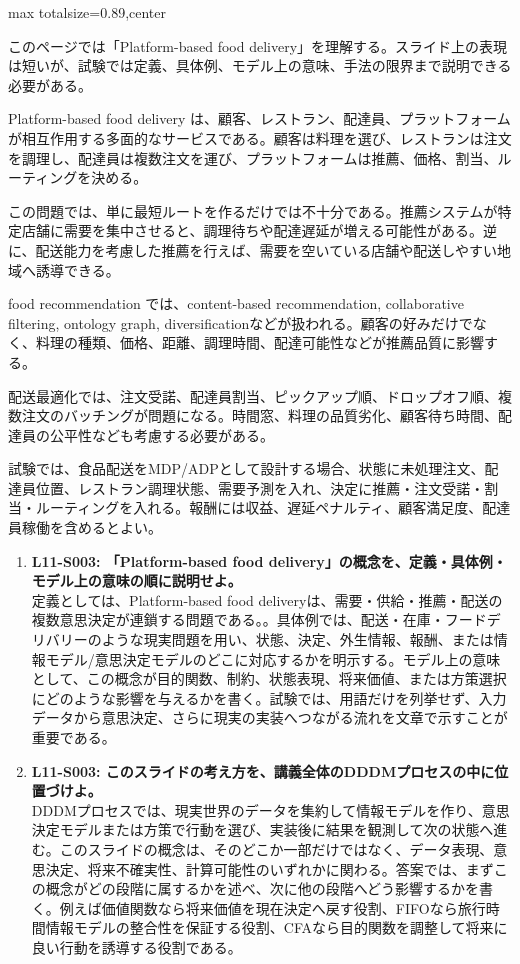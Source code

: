 \begin{minipage}[t]{0.58\textwidth}
\begin{adjustbox}{max totalsize={\textwidth}{0.89\textheight},center}
\begin{minipage}{\textwidth}\scriptsize
{}このページでは「Platform-based food delivery」を理解する。スライド上の表現は短いが、試験では定義、具体例、モデル上の意味、手法の限界まで説明できる必要がある。\par
Platform-based food delivery は、顧客、レストラン、配達員、プラットフォームが相互作用する多面的なサービスである。顧客は料理を選び、レストランは注文を調理し、配達員は複数注文を運び、プラットフォームは推薦、価格、割当、ルーティングを決める。\par
この問題では、単に最短ルートを作るだけでは不十分である。推薦システムが特定店舗に需要を集中させると、調理待ちや配達遅延が増える可能性がある。逆に、配送能力を考慮した推薦を行えば、需要を空いている店舗や配送しやすい地域へ誘導できる。\par
food recommendation では、content-based recommendation, collaborative filtering, ontology graph, diversificationなどが扱われる。顧客の好みだけでなく、料理の種類、価格、距離、調理時間、配達可能性などが推薦品質に影響する。\par
配送最適化では、注文受諾、配達員割当、ピックアップ順、ドロップオフ順、複数注文のバッチングが問題になる。時間窓、料理の品質劣化、顧客待ち時間、配達員の公平性なども考慮する必要がある。\par
試験では、食品配送をMDP/ADPとして設計する場合、状態に未処理注文、配達員位置、レストラン調理状態、需要予測を入れ、決定に推薦・注文受諾・割当・ルーティングを入れる。報酬には収益、遅延ペナルティ、顧客満足度、配達員稼働を含めるとよい。\par{}\begin{enumerate}\item \textbf{L11-S003: 「Platform-based food delivery」の概念を、定義・具体例・モデル上の意味の順に説明せよ。}\\定義としては、Platform-based food deliveryは、需要・供給・推薦・配送の複数意思決定が連鎖する問題である。。具体例では、配送・在庫・フードデリバリーのような現実問題を用い、状態、決定、外生情報、報酬、または情報モデル/意思決定モデルのどこに対応するかを明示する。モデル上の意味として、この概念が目的関数、制約、状態表現、将来価値、または方策選択にどのような影響を与えるかを書く。試験では、用語だけを列挙せず、入力データから意思決定、さらに現実の実装へつながる流れを文章で示すことが重要である。\item \textbf{L11-S003: このスライドの考え方を、講義全体のDDDMプロセスの中に位置づけよ。}\\DDDMプロセスでは、現実世界のデータを集約して情報モデルを作り、意思決定モデルまたは方策で行動を選び、実装後に結果を観測して次の状態へ進む。このスライドの概念は、そのどこか一部だけではなく、データ表現、意思決定、将来不確実性、計算可能性のいずれかに関わる。答案では、まずこの概念がどの段階に属するかを述べ、次に他の段階へどう影響するかを書く。例えば価値関数なら将来価値を現在決定へ戻す役割、FIFOなら旅行時間情報モデルの整合性を保証する役割、CFAなら目的関数を調整して将来に良い行動を誘導する役割である。\end{enumerate}

\end{minipage}
\end{adjustbox}
\end{minipage}
